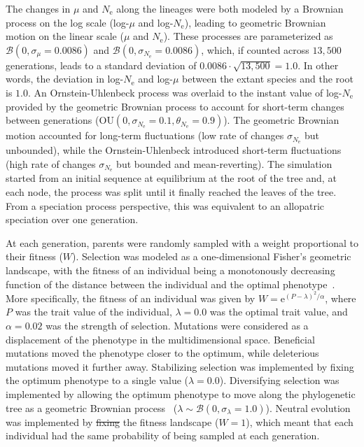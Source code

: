 \documentclass{article}
\newcommand{\Multiply}{\cdot}
\newcommand{\e}{\text{e}}
\newcommand{\Ne}{N_{\text{e}}}
\newcommand{\Trait}{P}
\newcommand{\MutationRatePheno}{\mu}
\newcommand{\brownian}{\mathcal{B}}
\providecommand{\DIFaddtex}[1]{{\protect\color{blue}\uwave{#1}}} %
\providecommand{\DIFdeltex}[1]{{\protect\color{red}\sout{#1}}}                      %
\providecommand{\DIFaddbegin}{} %
\providecommand{\DIFaddend}{} %
\providecommand{\DIFdelbegin}{} %
\providecommand{\DIFdelend}{} %
\providecommand{\DIFadd}[1]{\texorpdfstring{\DIFaddtex{#1}}{#1}} %
\providecommand{\DIFdel}[1]{\texorpdfstring{\DIFdeltex{#1}}{}} %
\newcommand{\DIFscaledelfig}{0.5}
\newlength{\DIFdelgraphicswidth} %
\newlength{\DIFdelgraphicsheight} %
\newcommand{\DIFaddincludegraphics}[2][]{{\color{blue}\fbox{\DIFOincludegraphics[#1]{#2}}}} %
\newcommand{\DIFdelincludegraphics}[2][]{%
\sbox{\DIFdelgraphicsbox}{\DIFOincludegraphics[#1]{#2}}%
\settoboxwidth{\DIFdelgraphicswidth}{\DIFdelgraphicsbox} %
\settoboxtotalheight{\DIFdelgraphicsheight}{\DIFdelgraphicsbox} %
\scalebox{\DIFscaledelfig}{%
\parbox[b]{\DIFdelgraphicswidth}{\usebox{\DIFdelgraphicsbox}\\[-\baselineskip] \rule{\DIFdelgraphicswidth}{0em}}\llap{\resizebox{\DIFdelgraphicswidth}{\DIFdelgraphicsheight}{%
\setlength{\unitlength}{\DIFdelgraphicswidth}%
\begin{picture}(1,1)%
\thicklines\linethickness{2pt} %
{\color[rgb]{1,0,0}\put(0,0){\framebox(1,1){}}}%
{\color[rgb]{1,0,0}\put(0,0){\line( 1,1){1}}}%
{\color[rgb]{1,0,0}\put(0,1){\line(1,-1){1}}}%
\end{picture}%
}\hspace*{3pt}}} %
} %
\DeclareRobustCommand{\DIFaddbegin}{\DIFOaddbegin \let\includegraphics\DIFaddincludegraphics} %
\DeclareRobustCommand{\DIFaddend}{\DIFOaddend \let\includegraphics\DIFOincludegraphics} %
\DeclareRobustCommand{\DIFdelbegin}{\DIFOdelbegin \let\includegraphics\DIFdelincludegraphics} %
\DeclareRobustCommand{\DIFdelend}{\DIFOaddend \let\includegraphics\DIFOincludegraphics} %
\begin{document}
The changes in $\MutationRatePheno$ and $\Ne$ along the lineages were both modeled by a Brownian process on the log scale (log-$\MutationRatePheno$ and log-$\Ne$), leading to geometric Brownian motion on the linear scale ($\MutationRatePheno$ and $\Ne$).
These processes are parameterized as $\brownian \left(0, \sigma_{\MutationRatePheno}=0.0086\right)$ and $\brownian \left(0, \sigma_{\Ne}=0.0086\right)$, which, if counted across $13,500$ generations, leads to a standard deviation of $0.0086 \Multiply \sqrt {13,500} = 1.0$.
In other words, the deviation in log-$\Ne$ and log-$\MutationRatePheno$  between the extant species and the root is $1.0$.
An Ornstein-Uhlenbeck process was overlaid to the instant value of log-$\Ne$ provided by the geometric Brownian process to account for short-term changes between generations ($\text{OU} \left(0, \sigma_{\Ne}=0.1, \theta_{\Ne}=0.9\right)$).
The geometric Brownian motion accounted for long-term fluctuations (low rate of changes $\sigma_{\Ne}$ but unbounded), while the Ornstein-Uhlenbeck introduced short-term fluctuations (high rate of changes $\sigma_{\Ne}$ but bounded and mean-reverting).
The simulation started from an initial sequence at equilibrium at the root of the tree and, at each node, the process was split until it finally reached the leaves of the tree.
From a speciation process perspective, this was equivalent to an allopatric speciation over one generation.

At each generation, parents were randomly sampled with a weight proportional to their fitness ($W$).
Selection was modeled as a one-dimensional Fisher's geometric landscape, with the fitness of an individual being a monotonously decreasing function of the distance between the individual and the optimal phenotype~\citep{tenaillon_utility_2014,blanquart_epistasis_2016}.
More specifically, the fitness of an individual was given by $W = \e^{(\Trait - \lambda)^2/ \alpha}$, where $\Trait$ was the trait value of the individual, $\lambda=0.0$ was the optimal trait value, and $\alpha=0.02$ was the strength of selection.
Mutations were considered as a displacement of the phenotype in the multidimensional space.
Beneficial mutations moved the phenotype closer to the optimum, while deleterious mutations moved it further away.
Stabilizing selection was implemented by fixing the optimum phenotype to a single value ($\lambda=0.0$).
Diversifying selection was implemented by allowing the optimum phenotype to move along the phylogenetic tree as a geometric Brownian process~\citep{hansen_stabilizing_1997} ($\lambda \sim \brownian \left(0, \sigma_{\lambda}=1.0\right)$).
Neutral evolution was implemented by \DIFdelbegin \DIFdel{fixing }\DIFdelend \DIFaddbegin \DIFadd{flattening }\DIFaddend the fitness landscape ($W=1$), which meant that each individual had the same probability of being sampled at each generation.
\end{document}
